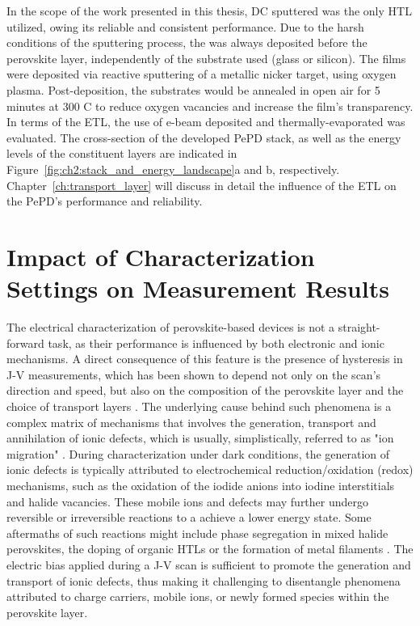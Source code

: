 In the scope of the work presented in this thesis, DC sputtered  was the only HTL utilized, owing its reliable and consistent performance. Due to the harsh conditions of the sputtering process, the  was always deposited before the perovskite layer, independently of the substrate used (glass or silicon). The films were deposited via reactive sputtering of a metallic nicker target, using oxygen plasma. Post-deposition, the substrates would be annealed in open air for 5 minutes at 300 \degree
C to reduce oxygen vacancies and increase the film's transparency. In terms of the ETL, the use of e-beam deposited  and thermally-evaporated  was evaluated. The cross-section of the developed PePD stack, as well as the energy levels of the constituent layers are indicated in Figure~\ref{fig:ch2:stack_and_energy_landscape}a and b, respectively. Chapter~\ref{ch:transport_layer} will discuss in detail the influence of the ETL on the PePD's performance and reliability. 


\section{Impact of Characterization Settings on Measurement Results}



The electrical characterization of perovskite-based devices is not a straight-forward task, as their performance is influenced by both electronic and ionic mechanisms. A direct consequence of this feature is the presence of hysteresis in J-V measurements, which has been shown to depend not only on the scan's direction and speed, but also on the composition of the perovskite layer and the choice of transport layers \cite{Snaith2014AnomalousCells,Dualeh2014ImpedanceCells}.
The underlying cause behind such phenomena is a complex matrix of mechanisms that involves the generation, transport and annihilation of ionic defects, which is usually, simplistically, referred to as "ion migration" \cite{Xu2024BeyondPerspective}. During characterization under dark conditions, the generation of ionic defects is typically attributed to electrochemical reduction/oxidation (redox) mechanisms, such as the oxidation of the iodide anions into iodine interstitials and halide vacancies. These mobile ions and defects may further undergo reversible or irreversible reactions to a achieve a lower energy state. Some aftermaths of such  reactions might include phase segregation in mixed halide perovskites, the doping of organic HTLs or the formation of metal filaments \cite{Kerner2021OrganicDevices, Hoke2014ReversiblePhotovoltaics,Xu2023Reverse-biasCells}. The electric bias applied during a J-V scan is sufficient to promote the generation and transport of ionic defects, thus making it challenging to disentangle phenomena attributed to charge carriers, mobile ions, or newly formed species within the perovskite layer. 

